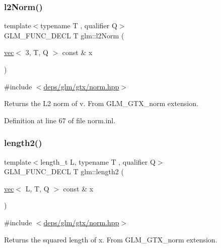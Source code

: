 \mbox{\label{group__gtx__norm_gae288bde8f0e41fb4ed62e65137b18cba}} 
\subsubsection{\texorpdfstring{l2\+Norm()}{l2Norm()}\hspace{0.1cm}{\footnotesize\ttfamily [2/2]}}
{\footnotesize\ttfamily template$<$typename T , qualifier Q$>$ \\
G\+L\+M\+\_\+\+F\+U\+N\+C\+\_\+\+D\+E\+CL T glm\+::l2\+Norm (\begin{DoxyParamCaption}\item[{\hyperlink{structglm_1_1vec}{vec}$<$ 3, T, Q $>$ const \&}]{x }\end{DoxyParamCaption})}



{\ttfamily \#include $<$\hyperlink{norm_8hpp}{deps/glm/gtx/norm.\+hpp}$>$}

Returns the L2 norm of v. From G\+L\+M\+\_\+\+G\+T\+X\+\_\+norm extension. 

Definition at line 67 of file norm.\+inl.

\mbox{\label{group__gtx__norm_ga8d1789651050adb7024917984b41c3de}} 
\subsubsection{\texorpdfstring{length2()}{length2()}}
{\footnotesize\ttfamily template$<$length\+\_\+t L, typename T , qualifier Q$>$ \\
G\+L\+M\+\_\+\+F\+U\+N\+C\+\_\+\+D\+E\+CL T glm\+::length2 (\begin{DoxyParamCaption}\item[{\hyperlink{structglm_1_1vec}{vec}$<$ L, T, Q $>$ const \&}]{x }\end{DoxyParamCaption})}



{\ttfamily \#include $<$\hyperlink{norm_8hpp}{deps/glm/gtx/norm.\+hpp}$>$}

Returns the squared length of x. From G\+L\+M\+\_\+\+G\+T\+X\+\_\+norm extension. 

